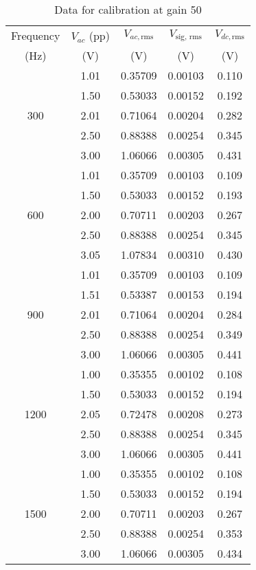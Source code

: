 \begin{table}[H]
    \centering
    \begin{tabular}{|c|c|c|c|c|}
    \hline
    Frequency& $V_{ac}$ (pp)& $V_{ac, \text{rms}}$& $V_\text{sig, rms}$ & $V_{dc, \text{rms}}$ \\
    (Hz) & (V) & (V) & (V) &  (V) \\ \hline
    \multirow{5}{*}{300} & 1.01 & 0.35709 & 0.00103 & 0.110 \\ \cline{2-5} 
     & 1.50 & 0.53033 & 0.00152 & 0.192 \\ \cline{2-5} 
     & 2.01 & 0.71064 & 0.00204 & 0.282 \\ \cline{2-5} 
     & 2.50 & 0.88388 & 0.00254 & 0.345 \\ \cline{2-5} 
     & 3.00 & 1.06066 & 0.00305 & 0.431 \\ \hline
    \multirow{5}{*}{600} & 1.01 & 0.35709 & 0.00103 & 0.109 \\ \cline{2-5} 
     & 1.50 & 0.53033 & 0.00152 & 0.193 \\ \cline{2-5} 
     & 2.00 & 0.70711 & 0.00203 & 0.267 \\ \cline{2-5} 
     & 2.50 & 0.88388 & 0.00254 & 0.345 \\ \cline{2-5} 
     & 3.05 & 1.07834 & 0.00310 & 0.430 \\ \hline
    \multirow{5}{*}{900} & 1.01 & 0.35709 & 0.00103 & 0.109 \\ \cline{2-5} 
     & 1.51 & 0.53387 & 0.00153 & 0.194 \\ \cline{2-5} 
     & 2.01 & 0.71064 & 0.00204 & 0.284 \\ \cline{2-5} 
     & 2.50 & 0.88388 & 0.00254 & 0.349 \\ \cline{2-5} 
     & 3.00 & 1.06066 & 0.00305 & 0.441 \\ \hline
    \multirow{5}{*}{1200} & 1.00 & 0.35355 & 0.00102 & 0.108 \\ \cline{2-5} 
     & 1.50 & 0.53033 & 0.00152 & 0.194 \\ \cline{2-5} 
     & 2.05 & 0.72478 & 0.00208 & 0.273 \\ \cline{2-5} 
     & 2.50 & 0.88388 & 0.00254 & 0.345 \\ \cline{2-5} 
     & 3.00 & 1.06066 & 0.00305 & 0.441 \\ \hline
    \multirow{5}{*}{1500} & 1.00 & 0.35355 & 0.00102 & 0.108 \\ \cline{2-5} 
     & 1.50 & 0.53033 & 0.00152 & 0.194 \\ \cline{2-5} 
     & 2.00 & 0.70711 & 0.00203 & 0.267 \\ \cline{2-5} 
     & 2.50 & 0.88388 & 0.00254 & 0.353 \\ \cline{2-5} 
     & 3.00 & 1.06066 & 0.00305 & 0.434 \\ \hline
    \end{tabular}%
    \caption{Data for calibration at gain 50}
    \label{cal50}
    \end{table}